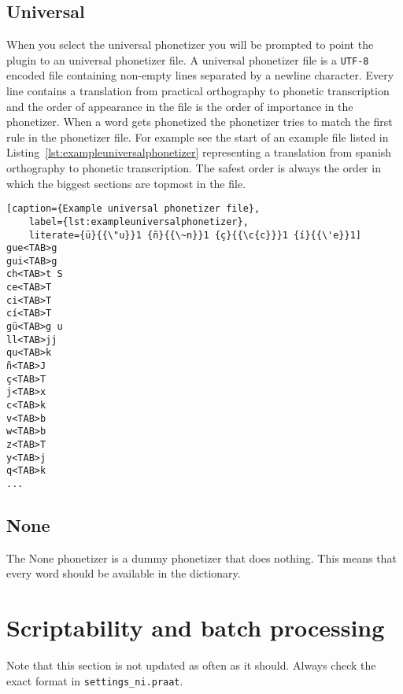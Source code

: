 
\subsection{Universal}\label{sec:univphonetizer}
When you select the universal phonetizer you will be prompted to point the
plugin to an universal phonetizer file.
A universal phonetizer file is a \texttt{UTF-8} encoded file containing
non-empty lines separated by a newline character. Every line contains a
translation from practical orthography to phonetic transcription and the order
of appearance in the file is the order of importance in the phonetizer. When a
word gets phonetized the phonetizer tries to match the first rule in the
phonetizer file. For example see the start of an example file listed in
Listing~\ref{lst:exampleuniversalphonetizer} representing a translation from
spanish orthography to phonetic transcription. The safest order is always the
order in which the biggest sections are topmost in the file.

\begin{lstlisting}[caption={Example universal phonetizer file},
	label={lst:exampleuniversalphonetizer},
	literate={ü}{{\"u}}1 {ñ}{{\~n}}1 {ç}{{\c{c}}}1 {í}{{\'e}}1]
gue<TAB>g
gui<TAB>g
ch<TAB>t S
ce<TAB>T
ci<TAB>T
cí<TAB>T
gü<TAB>g u
ll<TAB>jj
qu<TAB>k
ñ<TAB>J
ç<TAB>T
j<TAB>x
c<TAB>k
v<TAB>b
w<TAB>b
z<TAB>T
y<TAB>j
q<TAB>k
...
\end{lstlisting}

\subsection{None}
The None phonetizer is a dummy phonetizer that does nothing. This means that
every word should be available in the dictionary.

\section{Scriptability and batch processing}
Note that this section is not updated as often as it should. Always check the
exact format in \texttt{settings\_ni.praat}.

